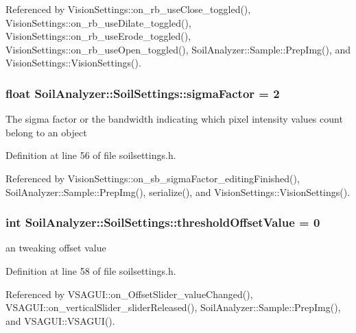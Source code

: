 Referenced by Vision\+Settings\+::on\+\_\+rb\+\_\+use\+Close\+\_\+toggled(), Vision\+Settings\+::on\+\_\+rb\+\_\+use\+Dilate\+\_\+toggled(), Vision\+Settings\+::on\+\_\+rb\+\_\+use\+Erode\+\_\+toggled(), Vision\+Settings\+::on\+\_\+rb\+\_\+use\+Open\+\_\+toggled(), Soil\+Analyzer\+::\+Sample\+::\+Prep\+Img(), and Vision\+Settings\+::\+Vision\+Settings().

\hypertarget{class_soil_analyzer_1_1_soil_settings_a97e62512e12a2ba9210fd93950b6e717}{}
\subsubsection[{sigma\+Factor}]{\setlength{\rightskip}{0pt plus 5cm}float Soil\+Analyzer\+::\+Soil\+Settings\+::sigma\+Factor = 2}\label{class_soil_analyzer_1_1_soil_settings_a97e62512e12a2ba9210fd93950b6e717}
The sigma factor or the bandwidth indicating which pixel intensity values count belong to an object 

Definition at line 56 of file soilsettings.\+h.



Referenced by Vision\+Settings\+::on\+\_\+sb\+\_\+sigma\+Factor\+\_\+editing\+Finished(), Soil\+Analyzer\+::\+Sample\+::\+Prep\+Img(), serialize(), and Vision\+Settings\+::\+Vision\+Settings().

\hypertarget{class_soil_analyzer_1_1_soil_settings_a48330eb812672b50a94483f264614e8f}{}
\subsubsection[{threshold\+Offset\+Value}]{\setlength{\rightskip}{0pt plus 5cm}int Soil\+Analyzer\+::\+Soil\+Settings\+::threshold\+Offset\+Value = 0}\label{class_soil_analyzer_1_1_soil_settings_a48330eb812672b50a94483f264614e8f}
an tweaking offset value 

Definition at line 58 of file soilsettings.\+h.



Referenced by V\+S\+A\+G\+U\+I\+::on\+\_\+\+Offset\+Slider\+\_\+value\+Changed(), V\+S\+A\+G\+U\+I\+::on\+\_\+vertical\+Slider\+\_\+slider\+Released(), Soil\+Analyzer\+::\+Sample\+::\+Prep\+Img(), and V\+S\+A\+G\+U\+I\+::\+V\+S\+A\+G\+U\+I().

